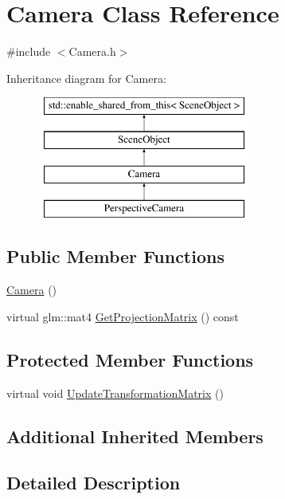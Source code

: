 \hypertarget{class_camera}{}\section{Camera Class Reference}
\label{class_camera}


{\ttfamily \#include $<$Camera.\+h$>$}

Inheritance diagram for Camera\+:\begin{figure}[H]
\begin{center}
\leavevmode
\includegraphics[height=4.000000cm]{class_camera}
\end{center}
\end{figure}
\subsection*{Public Member Functions}
\begin{DoxyCompactItemize}
\item 
\hyperlink{class_camera_a01f94c3543f56ede7af49dc778f19331}{Camera} ()
\item 
virtual glm\+::mat4 \hyperlink{class_camera_a497efa3119ab4ae679d29badf6f25682}{Get\+Projection\+Matrix} () const 
\end{DoxyCompactItemize}
\subsection*{Protected Member Functions}
\begin{DoxyCompactItemize}
\item 
virtual void \hyperlink{class_camera_aea640c892a3807671d8ca49616d96eda}{Update\+Transformation\+Matrix} ()
\end{DoxyCompactItemize}
\subsection*{Additional Inherited Members}


\subsection{Detailed Description}


